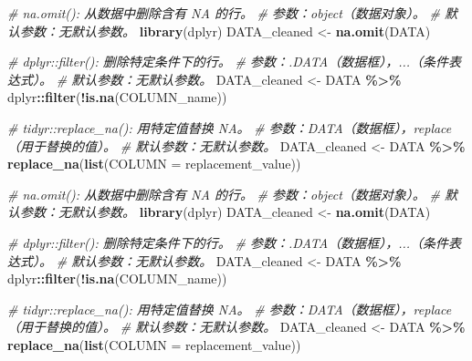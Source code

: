 \documentclass[
]{article}
\newenvironment{Shaded}{\begin{snugshade}}{\end{snugshade}}
\newcommand{\AttributeTok}[1]{\textcolor[rgb]{0.13,0.29,0.53}{#1}}
\newcommand{\CommentTok}[1]{\textcolor[rgb]{0.56,0.35,0.01}{\textit{#1}}}
\newcommand{\FunctionTok}[1]{\textcolor[rgb]{0.13,0.29,0.53}{\textbf{#1}}}
\newcommand{\NormalTok}[1]{#1}
\newcommand{\OtherTok}[1]{\textcolor[rgb]{0.56,0.35,0.01}{#1}}
\newcommand{\SpecialCharTok}[1]{\textcolor[rgb]{0.81,0.36,0.00}{\textbf{#1}}}
\begin{document}
\begin{Shaded}
\begin{Highlighting}[]
\CommentTok{\# na.omit(): 从数据中删除含有 NA 的行。}
\CommentTok{\# 参数：object（数据对象）。}
\CommentTok{\# 默认参数：无默认参数。}
\FunctionTok{library}\NormalTok{(dplyr)}
\NormalTok{DATA\_cleaned }\OtherTok{\textless{}{-}} \FunctionTok{na.omit}\NormalTok{(DATA)}

\CommentTok{\# dplyr::filter(): 删除特定条件下的行。}
\CommentTok{\# 参数：.DATA（数据框），...（条件表达式）。}
\CommentTok{\# 默认参数：无默认参数。}
\NormalTok{DATA\_cleaned }\OtherTok{\textless{}{-}}\NormalTok{ DATA }\SpecialCharTok{\%\textgreater{}\%} 
\NormalTok{  dplyr}\SpecialCharTok{::}\FunctionTok{filter}\NormalTok{(}\SpecialCharTok{!}\FunctionTok{is.na}\NormalTok{(COLUMN\_name))}

\CommentTok{\# tidyr::replace\_na(): 用特定值替换 NA。}
\CommentTok{\# 参数：DATA（数据框），replace（用于替换的值）。}
\CommentTok{\# 默认参数：无默认参数。}
\NormalTok{DATA\_cleaned }\OtherTok{\textless{}{-}}\NormalTok{ DATA }\SpecialCharTok{\%\textgreater{}\%} 
  \FunctionTok{replace\_na}\NormalTok{(}\FunctionTok{list}\NormalTok{(}\AttributeTok{COLUMN =}\NormalTok{ replacement\_value))}
\end{Highlighting}
\end{Shaded}

\begin{Shaded}
\begin{Highlighting}[]
\CommentTok{\# na.omit(): 从数据中删除含有 NA 的行。}
\CommentTok{\# 参数：object（数据对象）。}
\CommentTok{\# 默认参数：无默认参数。}
\FunctionTok{library}\NormalTok{(dplyr)}
\NormalTok{DATA\_cleaned }\OtherTok{\textless{}{-}} \FunctionTok{na.omit}\NormalTok{(DATA)}

\CommentTok{\# dplyr::filter(): 删除特定条件下的行。}
\CommentTok{\# 参数：.DATA（数据框），...（条件表达式）。}
\CommentTok{\# 默认参数：无默认参数。}
\NormalTok{DATA\_cleaned }\OtherTok{\textless{}{-}}\NormalTok{ DATA }\SpecialCharTok{\%\textgreater{}\%} 
\NormalTok{  dplyr}\SpecialCharTok{::}\FunctionTok{filter}\NormalTok{(}\SpecialCharTok{!}\FunctionTok{is.na}\NormalTok{(COLUMN\_name))}

\CommentTok{\# tidyr::replace\_na(): 用特定值替换 NA。}
\CommentTok{\# 参数：DATA（数据框），replace（用于替换的值）。}
\CommentTok{\# 默认参数：无默认参数。}
\NormalTok{DATA\_cleaned }\OtherTok{\textless{}{-}}\NormalTok{ DATA }\SpecialCharTok{\%\textgreater{}\%} 
  \FunctionTok{replace\_na}\NormalTok{(}\FunctionTok{list}\NormalTok{(}\AttributeTok{COLUMN =}\NormalTok{ replacement\_value))}
\end{Highlighting}
\end{Shaded}
\end{document}
